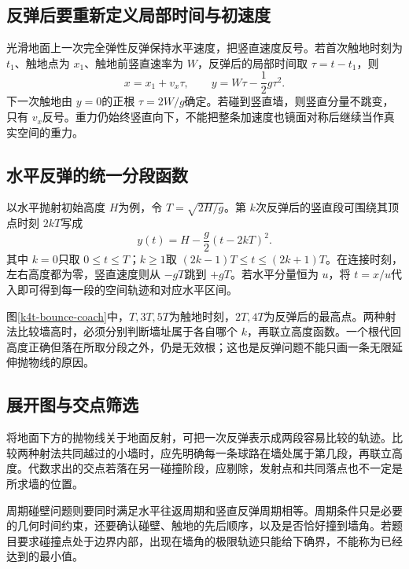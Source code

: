 \subsection{反弹后要重新定义局部时间与初速度}
光滑地面上一次完全弹性反弹保持水平速度，把竖直速度反号。若首次触地时刻为 $t_1$、触地点为 $x_1$、触地前竖直速率为 $W$，反弹后的局部时间取 $\tau=t-t_1$，则
\[x=x_1+v_x\tau,\qquad y=W\tau-\frac12g\tau^2.
\]
下一次触地由 $y=0$的正根 $\tau=2W/g$确定。若碰到竖直墙，则竖直分量不跳变，只有 $v_x$反号。重力仍始终竖直向下，不能把整条加速度也镜面对称后继续当作真实空间的重力。


\subsection{水平反弹的统一分段函数}
以水平抛射初始高度 $H$为例，令 $T=\sqrt{2H/g}$。第 $k$次反弹后的竖直段可围绕其顶点时刻 $2kT$写成
\[y(t)=H-\frac g2(t-2kT)^2.
\]
其中 $k=0$只取 $0\le t\le T$；$k\ge1$取 $(2k-1)T\le t\le(2k+1)T$。在连接时刻，左右高度都为零，竖直速度则从 $-gT$跳到 $+gT$。若水平分量恒为 $u$，将 $t=x/u$代入即可得到每一段的空间轨迹和对应水平区间。

图\ref{k4t-bounce-coach}中，$T,3T,5T$为触地时刻，$2T,4T$为反弹后的最高点。两种射法比较墙高时，必须分别判断墙址属于各自哪个 $k$，再联立高度函数。一个根代回高度正确但落在所取分段之外，仍是无效根；这也是反弹问题不能只画一条无限延伸抛物线的原因。

\subsection{展开图与交点筛选}
将地面下方的抛物线关于地面反射，可把一次反弹表示成两段容易比较的轨迹。比较两种射法共同越过的小墙时，应先明确每一条球路在墙处属于第几段，再联立高度。代数求出的交点若落在另一碰撞阶段，应剔除，发射点和共同落点也不一定是所求墙的位置。

周期碰壁问题则要同时满足水平往返周期和竖直反弹周期相等。周期条件只是必要的几何时间约束，还要确认碰壁、触地的先后顺序，以及是否恰好撞到墙角。若题目要求碰撞点处于边界内部，出现在墙角的极限轨迹只能给下确界，不能称为已经达到的最小值。
